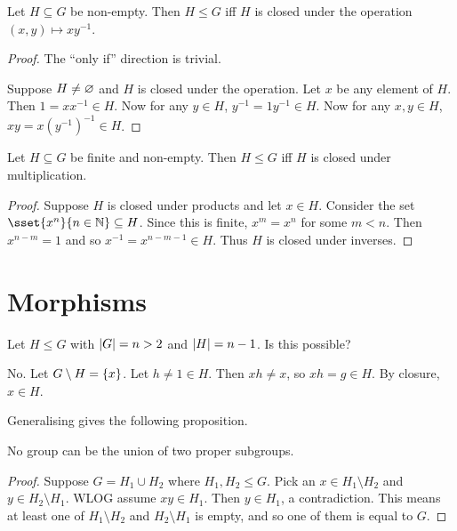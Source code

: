 \begin{proposition*}
    Let $H \subseteq G$ be non-empty.
    Then $H \le G$ iff $H$ is closed under the operation
    $(x, y) \mapsto xy^{-1}$.
\end{proposition*}
\begin{proof}
    The ``only if'' direction is trivial.

    Suppose $H \ne \varnothing$ and $H$ is closed under the operation.
    Let $x$ be any element of $H$.
    Then $1 = xx^{-1} \in H$.
    Now for any $y \in H$, $y^{-1} = 1y^{-1} \in H$.
    Now for any $x, y \in H$, $xy = x(y^{-1})^{-1} \in H$.
\end{proof}

\begin{proposition}
    Let $H \subseteq G$ be finite and non-empty.
    Then $H \le G$ iff $H$ is closed under multiplication.
\end{proposition}
\begin{proof}
    Suppose $H$ is closed under products and let $x \in H$.
    Consider the set $\sset{x^n}{n \in \N} \subseteq H$.
    Since this is finite, $x^m = x^n$ for some $m < n$.
    Then $x^{n-m} = 1$ and so $x^{-1} = x^{n-m-1} \in H$.
    Thus $H$ is closed under inverses.
\end{proof}

\section{Morphisms} \label{sec:group:morph}
\begin{example}
    Let $H \le G$ with $\lvert G\rvert = n > 2$ and $\lvert H\rvert = n-1$.
    Is this possible?

    No. Let $G \setminus H = \{x\}$.
    Let $h \ne 1 \in H$.
    Then $xh \ne x$, so $xh = g \in H$.
    By closure, $x \in H$.
\end{example}

Generalising gives the following proposition.
\begin{proposition}
    No group can be the union of two proper subgroups.
\end{proposition}
\begin{proof}
    Suppose $G = H_1 \cup H_2$ where $H_1, H_2 \le G$.
    Pick an $x \in H_1 \setminus H_2$ and $y \in H_2 \setminus H_1$.
    WLOG assume $xy \in H_1$.
    Then $y \in H_1$, a contradiction.
    This means at least one of $H_1 \setminus H_2$ and $H_2 \setminus H_1$
    is empty, and so one of them is equal to $G$.
\end{proof}

